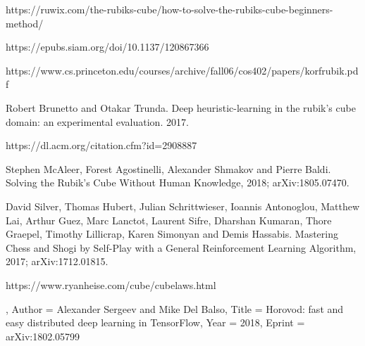 \documentclass[10pt,twocolumn,letterpaper]{article}
\begin{document}



\begin{thebibliography}{9}

\bibitem{}
https://ruwix.com/the-rubiks-cube/how-to-solve-the-rubiks-cube-beginners-method/

\bibitem{}
https://epubs.siam.org/doi/10.1137/120867366

\bibitem{}
https://www.cs.princeton.edu/courses/archive/fall06/cos402/papers/korfrubik.pdf

\bibitem{}
Robert Brunetto and Otakar Trunda. Deep heuristic-learning in the rubik’s cube domain: an experimental evaluation. 2017.

\bibitem{}
https://dl.acm.org/citation.cfm?id=2908887

Stephen McAleer, Forest Agostinelli, Alexander Shmakov and Pierre Baldi.
\newblock Solving the Rubik's Cube Without Human Knowledge, 2018;
\newblock arXiv:1805.07470.

David Silver, Thomas Hubert, Julian Schrittwieser, Ioannis Antonoglou, Matthew Lai, Arthur Guez, Marc Lanctot, Laurent Sifre, Dharshan Kumaran, Thore Graepel, Timothy Lillicrap, Karen Simonyan and Demis Hassabis.
\newblock Mastering Chess and Shogi by Self-Play with a General Reinforcement Learning Algorithm, 2017;
\newblock arXiv:1712.01815.

\bibitem{}
https://www.ryanheise.com/cube/cube\textunderscore laws.html

,
Author = {Alexander Sergeev and Mike Del Balso},
Title = {Horovod: fast and easy distributed deep learning in TensorFlow},
Year = {2018},
Eprint = {arXiv:1802.05799}

\end{thebibliography}

{\small


}
\end{document}
